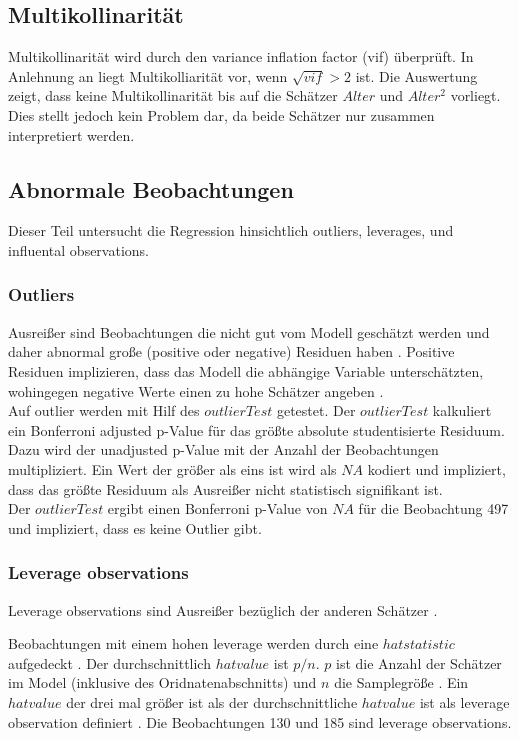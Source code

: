 \documentclass[11pt,a4paper]{article}
\begin{document}
\subsection{Multikollinarität}
Multikollinarität wird durch den variance inflation factor (vif) überprüft. In Anlehnung an \textcite{kabacoff2015r} liegt Multikolliarität vor, wenn $\sqrt{vif}>2$ ist. Die Auswertung zeigt, dass keine Multikollinarität bis auf die Schätzer $Alter$ und $Alter^2$ vorliegt. Dies stellt jedoch kein Problem dar, da beide Schätzer nur zusammen interpretiert werden. 

\subsection{Abnormale Beobachtungen}
Dieser Teil untersucht die Regression hinsichtlich outliers, leverages, und influental observations. 

\subsubsection{Outliers}
Ausreißer sind Beobachtungen die nicht gut vom Modell geschätzt werden und daher abnormal große (positive oder negative) Residuen haben \parencite{kabacoff2015r}. Positive Residuen implizieren, dass das Modell die abhängige Variable unterschätzten, wohingegen negative Werte einen zu hohe Schätzer angeben \parencite{kabacoff2015r}.\\
Auf outlier werden mit Hilf des $outlierTest$ getestet. Der $outlierTest$ kalkuliert ein Bonferroni adjusted p-Value für das größte absolute studentisierte Residuum. Dazu wird der unadjusted p-Value mit der Anzahl der Beobachtungen multipliziert. Ein Wert der größer als eins ist wird als $NA$ kodiert und impliziert, dass das größte Residuum als Ausreißer nicht statistisch signifikant ist.\\

Der $outlierTest$ ergibt einen Bonferroni p-Value von $NA$ für die Beobachtung 497 und impliziert, dass es keine Outlier gibt.  


\subsubsection{Leverage observations}
Leverage observations sind Ausreißer bezüglich der anderen Schätzer \parencite{kabacoff2015r}. 

  
Beobachtungen mit einem hohen leverage werden durch eine $hat statistic$ aufgedeckt \parencite{kabacoff2015r}. Der durchschnittlich $hat value$ ist $p/n$. $p$ ist die Anzahl der Schätzer im Model (inklusive des Oridnatenabschnitts) und $n$ die Samplegröße \parencite{kabacoff2015r}. Ein $hat value$ der drei mal größer ist als der durchschnittliche $hat value$ ist als leverage observation definiert \parencite{kabacoff2015r}. Die Beobachtungen 130 und 185 sind leverage observations. %
\end{document}
